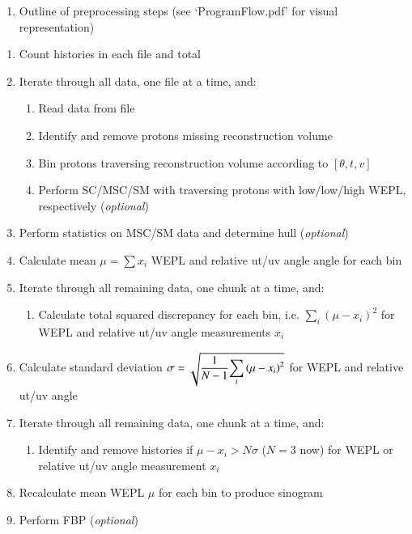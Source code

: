 \documentclass{article}
\begin{document}
\begin{enumerate}[label = (\arabic*), leftmargin = 0.0cm, series = section]
\bfseries
\item Outline of preprocessing steps (see `ProgramFlow.pdf' for visual representation)
\end{enumerate}
\begin{enumerate}
    \item Count histories in each file and total
    \item Iterate through all data, one file at a time, and:
    \begin{enumerate}
        \item Read data from file
        \item Identify and remove protons missing reconstruction volume
        \item Bin protons traversing reconstruction volume according to $[\theta, t, v]$
        \item Perform SC/MSC/SM with traversing protons with low/low/high WEPL, respectively (\emph{optional})
    \end{enumerate}
    \item Perform statistics on MSC/SM data and determine hull (\emph{optional})
    \item Calculate mean $\mu = \sum x_i$ WEPL and relative ut/uv angle angle for each bin
    \item Iterate through all remaining data, one chunk at a time, and:
    \begin{enumerate}
        \item Calculate total squared discrepancy for each bin, i.e. $\sum\limits_i  \left(\mu - x_i\right)^2$ for WEPL and relative ut/uv angle measurements $x_i$
    \end{enumerate}
    \item Calculate standard deviation $\sigma = \sqrt{\dfrac{1}{N-1}\mathlarger{\sum\limits_i} \left(\mu - x_i\right)^2}$ for WEPL and relative ut/uv angle
    \item Iterate through all remaining data, one chunk at a time, and:
    \begin{enumerate}
        \item Identify and remove histories if $\mu - x_i > N\sigma$ ($N=3$ now) for WEPL or relative ut/uv angle measurement $x_i$
    \end{enumerate}
    \item Recalculate mean WEPL $\mu$ for each bin to produce sinogram
    \item Perform FBP (\emph{optional})
\end{enumerate}
\end{document}
